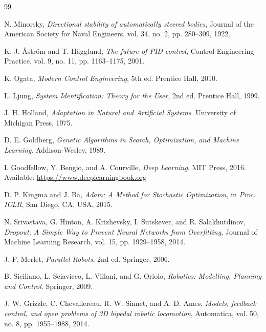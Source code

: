 
\begin{thebibliography}{99}

N. Minorsky,
\textit{Directional stability of automatically steered bodies},
Journal of the American Society for Naval Engineers, vol. 34, no. 2, pp. 280--309, 1922.

K. J. Åström and T. Hägglund,
\textit{The future of PID control},
Control Engineering Practice, vol. 9, no. 11, pp. 1163--1175, 2001.

K. Ogata,
\textit{Modern Control Engineering}, 5th ed.
Prentice Hall, 2010.

L. Ljung,
\textit{System Identification: Theory for the User}, 2nd ed.
Prentice Hall, 1999.

J. H. Holland,
\textit{Adaptation in Natural and Artificial Systems}.
University of Michigan Press, 1975.

D. E. Goldberg,
\textit{Genetic Algorithms in Search, Optimization, and Machine Learning}.
Addison-Wesley, 1989.

I. Goodfellow, Y. Bengio, and A. Courville,
\textit{Deep Learning}.
MIT Press, 2016. Available: \url{https://www.deeplearningbook.org}

D. P. Kingma and J. Ba,
\textit{Adam: A Method for Stochastic Optimization},
in \textit{Proc. ICLR}, San Diego, CA, USA, 2015.

N. Srivastava, G. Hinton, A. Krizhevsky, I. Sutskever, and R. Salakhutdinov,
\textit{Dropout: A Simple Way to Prevent Neural Networks from Overfitting},
Journal of Machine Learning Research, vol. 15, pp. 1929--1958, 2014.

J.-P. Merlet,
\textit{Parallel Robots}, 2nd ed.
Springer, 2006.

B. Siciliano, L. Sciavicco, L. Villani, and G. Oriolo,
\textit{Robotics: Modelling, Planning and Control}.
Springer, 2009.

J. W. Grizzle, C. Chevallereau, R. W. Sinnet, and A. D. Ames,
\textit{Models, feedback control, and open problems of 3D bipedal robotic locomotion},
Automatica, vol. 50, no. 8, pp. 1955--1988, 2014.


\end{thebibliography}
